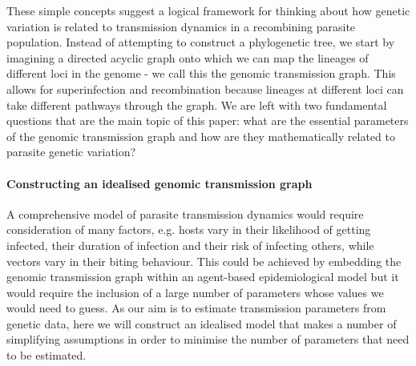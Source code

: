 \documentclass[_main.tex]{subfiles}
\begin{document}


These simple concepts suggest a logical framework for thinking about how genetic variation is related to transmission dynamics in a recombining parasite population.  Instead of attempting to construct a phylogenetic tree, we start by imagining a directed acyclic graph onto which we can map the lineages of different loci in the genome - we call this the genomic transmission graph.  This allows for superinfection and recombination because lineages at different loci can take different pathways through the graph.  We are left with two fundamental questions that are the main topic of this paper: what are the essential parameters of the genomic transmission graph and how are they mathematically related to parasite genetic variation?
  

\paragraph{Constructing an idealised genomic transmission graph} \label{idealised_tg}

A comprehensive model of parasite transmission dynamics would require consideration of many factors, e.g. hosts vary in their likelihood of getting infected, their duration of infection and their risk of infecting others, while vectors vary in their biting behaviour.  This could be achieved by embedding the genomic transmission graph within an agent-based epidemiological model but it would require the inclusion of a large number of parameters whose values we would need to guess.  As our aim is to estimate transmission parameters from genetic data, here we will construct an idealised model that makes a number of simplifying assumptions in order to minimise the number of parameters that need to be estimated.
\end{document}
